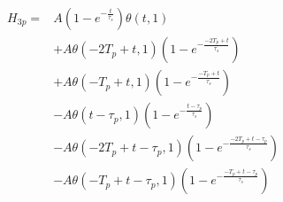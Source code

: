
\begin{align}
H_{3p} = & A \left(1 - e^{- \frac{t}{\tau_{s}}}\right) \theta\left(t, 1\right) \nonumber \\
& + A \theta\left(- 2 T_{p} + t, 1\right) \left(1 - e^{- \frac{- 2 T_{p} + t}{\tau_{s}}}\right) \nonumber \\
& + A \theta\left(- T_{p} + t, 1\right) \left(1 - e^{- \frac{- T_{p} + t}{\tau_{s}}}\right) \nonumber \\
& - A \theta\left(t - \tau_{p}, 1\right) \left(1 - e^{- \frac{t - \tau_{p}}{\tau_{s}}}\right) \nonumber \\
& - A \theta\left(- 2 T_{p} + t - \tau_{p}, 1\right) \left(1 - e^{- \frac{- 2 T_{p} + t - \tau_{p}}{\tau_{s}}}\right) \nonumber \\
& - A \theta\left(- T_{p} + t - \tau_{p}, 1\right) \left(1 - e^{- \frac{- T_{p} + t - \tau_{p}}{\tau_{s}}}\right) 
\end{align}\,\left[\mathrm{}\right]
